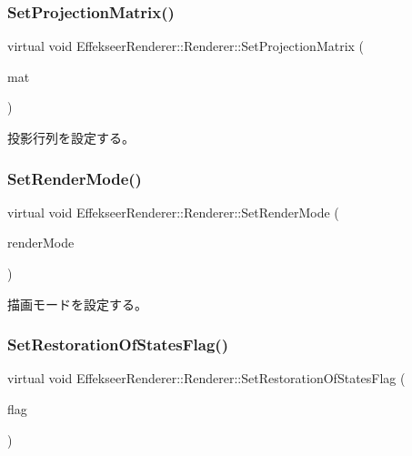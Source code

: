 \subsubsection{\texorpdfstring{Set\+Projection\+Matrix()}{SetProjectionMatrix()}}
{\footnotesize\ttfamily virtual void Effekseer\+Renderer\+::\+Renderer\+::\+Set\+Projection\+Matrix (\begin{DoxyParamCaption}\item[{const \+::\mbox{\hyperlink{struct_effekseer_1_1_matrix44}{Effekseer\+::\+Matrix44}} \&}]{mat }\end{DoxyParamCaption})\hspace{0.3cm}{\ttfamily [pure virtual]}}



投影行列を設定する。 

\mbox{\label{class_effekseer_renderer_1_1_renderer_ab0805785cad223b4a79d2d16fcd9bec8}} 
\subsubsection{\texorpdfstring{Set\+Render\+Mode()}{SetRenderMode()}}
{\footnotesize\ttfamily virtual void Effekseer\+Renderer\+::\+Renderer\+::\+Set\+Render\+Mode (\begin{DoxyParamCaption}\item[{\mbox{\hyperlink{namespace_effekseer_ad1b82893021dd8e3697e46c1aa544092}{Effekseer\+::\+Render\+Mode}}}]{render\+Mode }\end{DoxyParamCaption})\hspace{0.3cm}{\ttfamily [pure virtual]}}



描画モードを設定する。 

\mbox{\label{class_effekseer_renderer_1_1_renderer_ac6de8a0c0d65c03d3242ccfc9946c91c}} 
\subsubsection{\texorpdfstring{Set\+Restoration\+Of\+States\+Flag()}{SetRestorationOfStatesFlag()}}
{\footnotesize\ttfamily virtual void Effekseer\+Renderer\+::\+Renderer\+::\+Set\+Restoration\+Of\+States\+Flag (\begin{DoxyParamCaption}\item[{bool}]{flag }\end{DoxyParamCaption})\hspace{0.3cm}{\ttfamily [pure virtual]}}



